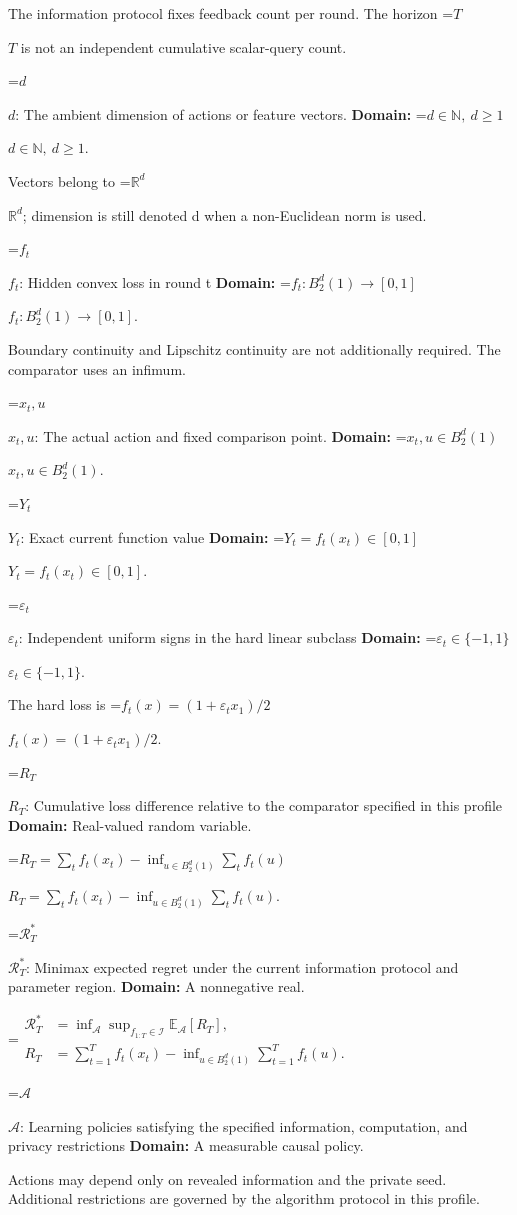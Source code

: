 \documentclass[10pt,a4paper]{article}
\newcommand{\AtlasMath}[1]{\par\begingroup\centering\setbox0=\hbox{$\displaystyle #1$}\ifdim\wd0>1.4\linewidth\typeout{ATLAS WIDE FORMULA: \the\wd0}\fi\ifdim\wd0>\linewidth\resizebox{\linewidth}{!}{\box0}\else\box0\fi\par\endgroup}
\newcommand{\AtlasInlineMath}[1]{\begingroup\setbox0=\hbox{$#1$}\ifdim\wd0>.4\linewidth\endgroup\AtlasMath{#1}\else\endgroup$#1$\fi}
\begin{document}
The information protocol fixes feedback count per round. The horizon \AtlasInlineMath{T} is not an independent cumulative scalar-query count.

\AtlasInlineMath{d}: The ambient dimension of actions or feature vectors. \textbf{Domain:} \AtlasInlineMath{d\in\mathbb N,\ d\ge1}.

Vectors belong to \AtlasInlineMath{\mathbb R^d}; dimension is still denoted d when a non-Euclidean norm is used.

\AtlasInlineMath{f_t}: Hidden convex loss in round t \textbf{Domain:} \AtlasInlineMath{f_t:B_2^d(1)\to[0,1]}.

Boundary continuity and Lipschitz continuity are not additionally required. The comparator uses an infimum.

\AtlasInlineMath{x_t,u}: The actual action and fixed comparison point. \textbf{Domain:} \AtlasInlineMath{x_t,u\in B_2^d(1)}.

\AtlasInlineMath{Y_t}: Exact current function value \textbf{Domain:} \AtlasInlineMath{Y_t=f_t(x_t)\in[0,1]}.

\AtlasInlineMath{\varepsilon_t}: Independent uniform signs in the hard linear subclass \textbf{Domain:} \AtlasInlineMath{\varepsilon_t\in\{-1,1\}}.

The hard loss is \AtlasInlineMath{f_t(x)=(1+\varepsilon_tx_1)/2}.

\AtlasInlineMath{R_T}: Cumulative loss difference relative to the comparator specified in this profile \textbf{Domain:} Real-valued random variable.

\AtlasInlineMath{R_T=\sum_tf_t(x_t)-\inf_{u\in B_2^d(1)}\sum_tf_t(u)}.

\AtlasInlineMath{\mathcal R_T^*}: Minimax expected regret under the current information protocol and parameter region. \textbf{Domain:} A nonnegative real.


\AtlasMath{\begin{aligned}\mathcal R_T^*&=\inf_{\mathcal A}\sup_{f_{1:T}\in\mathcal I}\mathbb E_{\mathcal A}[R_T],\\ R_T&=\sum_{t=1}^T f_t(x_t)-\inf_{u\in B_2^d(1)}\sum_{t=1}^T f_t(u).\end{aligned}}


\AtlasInlineMath{\mathcal A}: Learning policies satisfying the specified information, computation, and privacy restrictions \textbf{Domain:} A measurable causal policy.

Actions may depend only on revealed information and the private seed. Additional restrictions are governed by the algorithm protocol in this profile.
\end{document}
